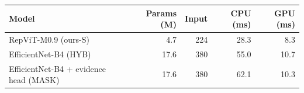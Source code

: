 \begin{tabular}{lrrrr}
\toprule
Model & Params (M) & Input & CPU (ms) & GPU (ms) \\
\midrule
RepViT-M0.9 (ours-S) & 4.7 & 224 & 28.3 & 8.3 \\
EfficientNet-B4 (HYB) & 17.6 & 380 & 55.0 & 10.7 \\
EfficientNet-B4 + evidence head (MASK) & 17.6 & 380 & 62.1 & 10.3 \\
\bottomrule
\end{tabular}
